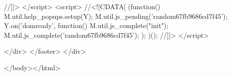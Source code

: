 //]]>
</script>
<script>
//<![CDATA[
(function() {M.util.help_popups.setup(Y);
 M.util.js_pending('random67fb9686cd7f45'); Y.on('domready', function() { M.util.js_complete("init");  M.util.js_complete('random67fb9686cd7f45'); });
})();
//]]>
</script>

        </div>
    </footer>
</div>


</body></html>